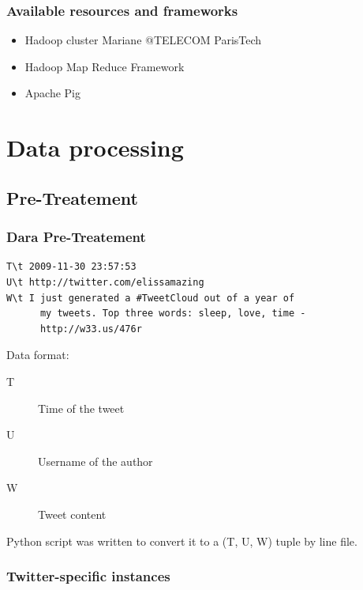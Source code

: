 \documentclass[handout]{beamer}
\begin{document}
\begin{frame}
\frametitle{\bf Available resources and frameworks}

\begin{itemize}
\item Hadoop cluster Mariane @TELECOM ParisTech
\item Hadoop Map Reduce Framework
\item Apache Pig
\end{itemize}

\end{frame}


\section{Data processing}

\subsection{Pre-Treatement}


\begin{frame}[fragile]
\frametitle{\bf Dara Pre-Treatement}

\begin{verbatim}
T\t 2009-11-30 23:57:53
U\t http://twitter.com/elissamazing
W\t I just generated a #TweetCloud out of a year of
      my tweets. Top three words: sleep, love, time -
      http://w33.us/476r
\end{verbatim}

Data format:
\begin{description}
\item[T] Time of the tweet
\item[U] Username of the author
\item[W] Tweet content
\end{description}
    
Python script was written to convert it to a (T, U, W) tuple by line file.

\end{frame}


\subsubsection{Twitter-specific instances}
\end{document}
